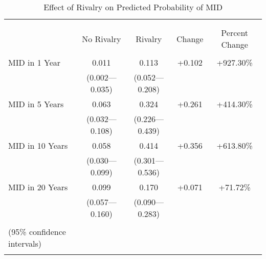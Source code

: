 \documentclass{article}
\begin{document}
\begin{table}[!htbp] \centering 
  \caption{Effect of Rivalry on Predicted Probability of MID} 
  \label{} 
\begin{tabular}{@{\extracolsep{5pt}}lcccc} 
\\[-1.8ex]\hline \\[-1.8ex] 
\\[-1.8ex] & No Rivalry & Rivalry & Change & Percent Change \\ 
\hline \\[-1.8ex] 
 MID in 1 Year & 0.011 & 0.113 & +0.102 & +927.30\%\\ 
  & (0.002---0.035) & (0.052---0.208) & &\\ 
  MID in 5 Years & 0.063 & 0.324 & +0.261 & +414.30\% \\ 
  & (0.032---0.108) & (0.226---0.439)  &  &\\ 
  MID in 10 Years & 0.058 & 0.414  & +0.356 & +613.80\% \\
  & (0.030---0.099) & (0.301---0.536)  &  &\\ 
  MID in 20 Years & 0.099 & 0.170 & +0.071 & +71.72\% \\ 
  & (0.057---0.160) & (0.090---0.283)  & & \\
\hline \\[-1.8ex] 
(95\% confidence intervals) \\ 
\normalsize 
\end{tabular} 
\end{table} 
\end{document}
